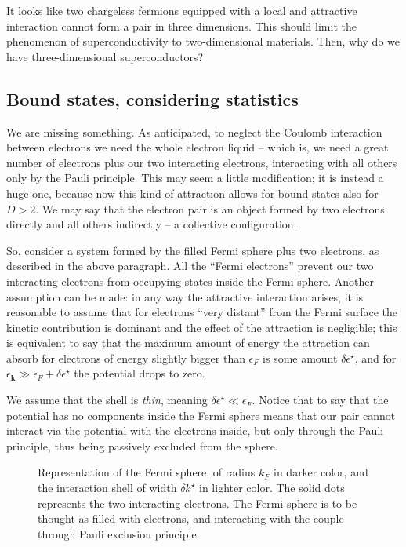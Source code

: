 It looks like two chargeless fermions equipped with a local and attractive interaction cannot form a pair in three dimensions. This should limit the phenomenon of superconductivity to two-dimensional materials. Then, why do we have three-dimensional superconductors? 

\subsection{Bound states, considering statistics}\label{subsec:bound states, considering statistics}

We are missing something. As anticipated, to neglect the Coulomb interaction between electrons we need the whole electron liquid -- which is, we need a great number of electrons plus our two interacting electrons, interacting with all others only by the Pauli principle. This may seem a little modification; it is instead a huge one, because now this kind of attraction allows for bound states also for $D>2$. We may say that the electron pair is an object formed by two electrons directly and all others indirectly -- a collective configuration.

So, consider a system formed by the filled Fermi sphere plus two electrons, as described in the above paragraph. All the ``Fermi electrons'' prevent our two interacting electrons from occupying states inside the Fermi sphere. Another assumption can be made: in any way the attractive interaction arises, it is reasonable to assume that for electrons ``very distant'' from the Fermi surface the kinetic contribution is dominant and the effect of the attraction is negligible; this is equivalent to say that the maximum amount of energy the attraction can absorb for electrons of energy slightly bigger than $\epsilon_F$ is some amount $\delta \epsilon^\star$, and for $\epsilon_\mathbf{k} \gg \epsilon_F + \delta \epsilon^\star$ the potential drops to zero.

We assume that the shell is \textit{thin}, meaning $\delta\epsilon^\star \ll \epsilon_F$. Notice that to say that the potential has no components inside the Fermi sphere means that our pair cannot interact via the potential with the electrons inside, but only through the Pauli principle, thus being passively excluded from the sphere.

\begin{figure}
	\centering
	
	\caption{Representation of the Fermi sphere, of radius $k_F$ in darker color, and the interaction shell of width $\delta k^\star$ in lighter color. The solid dots represents the two interacting electrons. The Fermi sphere is to be thought as filled with electrons, and interacting with the couple through Pauli exclusion principle.}
	\label{fig:fermi sphere and shell}
\end{figure}

